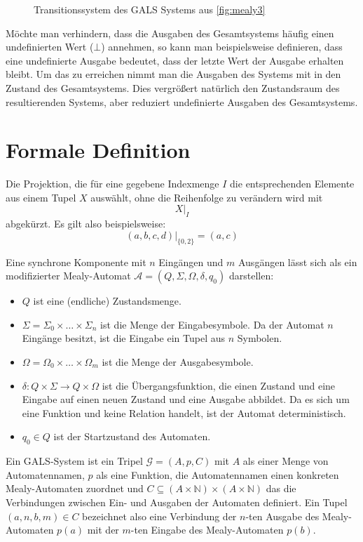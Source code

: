 \begin{figure}[h]
  \centering
  
  \caption{Transitionssystem des GALS Systems aus \ref{fig:mealy3}}
  \label{fig:gals_trans}
\end{figure}

Möchte man verhindern, dass die Ausgaben des Gesamtsystems häufig einen undefinierten Wert ($\bot$) annehmen, so kann man beispielsweise definieren, dass eine undefinierte Ausgabe bedeutet, dass der letzte Wert der Ausgabe erhalten bleibt.
Um das zu erreichen nimmt man die Ausgaben des Systems mit in den Zustand des Gesamtsystems.
Dies vergrößert natürlich den Zustandsraum des resultierenden Systems, aber reduziert undefinierte Ausgaben des Gesamtsystems.

\section{Formale Definition}
\begin{notation}
  Die Projektion, die für eine gegebene Indexmenge $I$ die entsprechenden Elemente aus einem Tupel $X$ auswählt, ohne die Reihenfolge zu verändern wird mit
  \[ X |_I \]
  abgekürzt.
  Es gilt also beispielsweise:
  \[ (a,b,c,d) |_{\{0,2\}} = (a,c) \]
\end{notation}
\label{sec:gals_formal_definition}
Eine synchrone Komponente mit $n$ Eingängen und $m$ Ausgängen lässt sich als ein modifizierter Mealy-Automat $\mathcal{A} = (Q,\Sigma,\Omega,\delta,q_0)$ darstellen:
\begin{itemize}
  \item $Q$ ist eine (endliche) Zustandsmenge.
  \item $\Sigma = \Sigma_0\times\dots\times\Sigma_n$ ist die Menge der Eingabesymbole.
    Da der Automat $n$ Eingänge besitzt, ist die Eingabe ein Tupel aus $n$ Symbolen.
  \item $\Omega = \Omega_0\times\dots\times\Omega_m$ ist die Menge der Ausgabesymbole.
  \item $\delta : Q\times\Sigma\rightarrow Q\times\Omega$ ist die Übergangsfunktion, die einen Zustand und eine Eingabe auf einen neuen Zustand und eine Ausgabe abbildet.
    Da es sich um eine Funktion und keine Relation handelt, ist der Automat deterministisch.
  \item $q_0\in Q$ ist der Startzustand des Automaten.
\end{itemize}

Ein GALS-System ist ein Tripel $\mathcal{G}=(A,p,C)$ mit $A$ als einer Menge von Automatennamen, $p$ als eine Funktion, die Automatennamen einen konkreten Mealy-Automaten zuordnet und $C\subseteq (A\times\mathbb{N})\times(A\times\mathbb{N})$ das die Verbindungen zwischen Ein- und Ausgaben der Automaten definiert.
Ein Tupel $(a,n,b,m)\in C$ bezeichnet also eine Verbindung der $n$-ten Ausgabe des Mealy-Automaten $p(a)$ mit der $m$-ten Eingabe des Mealy-Automaten $p(b)$.

